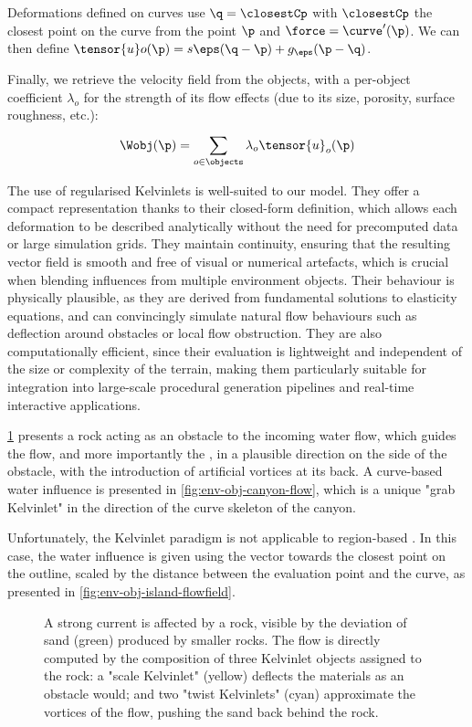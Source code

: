 Deformations defined on curves use $\q = \closestCp$ with $\closestCp$ the closest point on the curve from the point $\p$ and $\force = \curve'(\p)$. We can then define $\tensor{u}o(\p) = s\eps(\q - \p) + g_\eps(\p - \q)$.

Finally, we retrieve the velocity field from the objects, with a per-object coefficient $\lambda_o$ for the strength of its flow effects (due to its size, porosity, surface roughness, etc.):
\begin{align}
\Wobj(\p) = \sum_{o \in \objects}^{}{\lambda_o \tensor{u}_o(\p)}
\end{align}

The use of regularised Kelvinlets is well-suited to our model. They offer a compact representation thanks to their closed-form definition, which allows each deformation to be described analytically without the need for precomputed data or large simulation grids. They maintain continuity, ensuring that the resulting vector field is smooth and free of visual or numerical artefacts, which is crucial when blending influences from multiple environment objects. Their behaviour is physically plausible, as they are derived from fundamental solutions to elasticity equations, and can convincingly simulate natural flow behaviours such as deflection around obstacles or local flow obstruction. They are also computationally efficient, since their evaluation is lightweight and independent of the size or complexity of the terrain, making them particularly suitable for integration into large-scale procedural generation pipelines and real-time interactive applications.

\cref{fig:env-obj-rock-with-kelvinlets} presents a rock acting as an obstacle to the incoming water flow, which guides the flow, and more importantly the , in a plausible direction on the side of the obstacle, with the introduction of artificial vortices at its back. A curve-based water influence is presented in \cref{fig:env-obj-canyon-flow}, which is a unique "grab Kelvinlet" in the direction of the curve skeleton of the canyon.

Unfortunately, the Kelvinlet paradigm is not applicable to region-based . In this case, the water influence is given using the vector towards the closest point on the outline, scaled by the distance between the evaluation point and the curve, as presented in \cref{fig:env-obj-island-flowfield}.

\begin{figure}
\caption{A strong current is affected by a rock, visible by the deviation of sand (green) produced by smaller rocks. The flow is directly computed by the composition of three Kelvinlet objects assigned to the rock: a "scale Kelvinlet" (yellow) deflects the materials as an obstacle would; and two "twist Kelvinlets" (cyan) approximate the vortices of the flow, pushing the sand back behind the rock.}
\label{fig:env-obj-rock-with-kelvinlets}
\end{figure}

